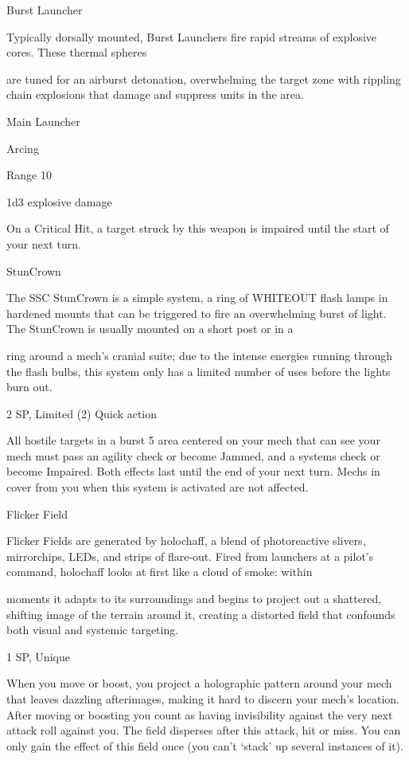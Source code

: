 Burst Launcher

Typically dorsally mounted, Burst Launchers fire rapid streams of explosive cores. These thermal spheres

are tuned for an airburst detonation, overwhelming the target zone with rippling chain explosions that
damage and suppress units in the area.

Main Launcher

Arcing

Range 10





1d3 explosive damage

On a Critical Hit, a target struck by this weapon is impaired until the start of your next turn.


StunCrown


The SSC StunCrown is a simple system, a ring of WHITEOUT flash lamps in hardened mounts that can be
triggered to fire an overwhelming burst of light. The StunCrown is usually mounted on a short post or in a

ring around a mech’s cranial suite; due to the intense energies running through the flash bulbs, this system
only has a limited number of uses before the lights burn out.

2 SP, Limited (2)
Quick action

All hostile targets in a burst 5 area centered on your mech that can see your mech must pass an
agility check or become Jammed, and a systems check or become Impaired. Both effects last
until the end of your next turn. Mechs in cover from you when this system is activated are not
affected.


Flicker Field

Flicker Fields are generated by holochaff, a blend of photoreactive slivers, mirrorchips, LEDs, and strips of
flare-out. Fired from launchers at a pilot’s command, holochaff looks at first like a cloud of smoke: within

moments it adapts to its surroundings and begins to project out a shattered, shifting image of the terrain
around it, creating a distorted field that confounds both visual and systemic targeting.

1 SP, Unique

When you move or boost, you project a holographic pattern around your mech that leaves
dazzling afterimages, making it hard to discern your mech’s location. After moving or boosting
you count as having invisibility against the very next attack roll against you. The field disperses
after this attack, hit or miss. You can only gain the effect of this field once (you can’t ‘stack’ up
several instances of it).


